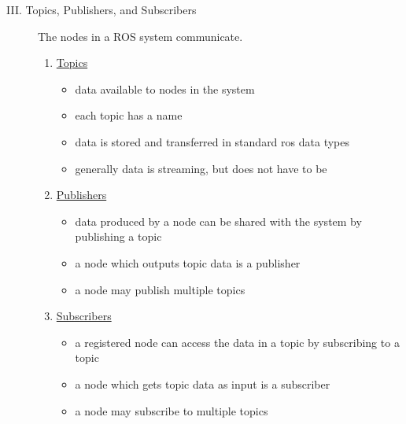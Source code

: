 \documentclass[12pt]{article}
\begin{document}
\begin{description}
    \item [III. Topics, Publishers, and Subscribers] The nodes in a ROS system communicate.  
        \begin{enumerate}   
           \item \href{http://wiki.ros.org/Topics}{Topics} 
                    \begin{itemize}
                        \item data available to nodes in the system
                        \item each topic has a name    
                        \item data is stored and transferred in standard ros data types
                        \item generally data is streaming, but does not have to be
                    \end{itemize}    
           \item \href{http://wiki.ros.org/ROS/Tutorials/WritingPublisherSubscriber(c++)}{Publishers}
                    \begin{itemize}
      
                        \item data produced by a node can be shared with the system by publishing a topic
                        \item a node which outputs topic data is a publisher
                        \item a node may publish multiple topics 
                        
                        \end{itemize}  
            \item \href{http://wiki.ros.org/ROS/Tutorials/WritingPublisherSubscriber(c++)}{Subscribers}
                \begin{itemize}
      
                        \item a registered node can access the data in a topic by subscribing to a topic
                        \item a node which gets topic data as input is a subscriber
                        \item a node may subscribe to multiple topics 
                    \end{itemize}  
                    

\end{enumerate}
\end{description}
\end{document}
